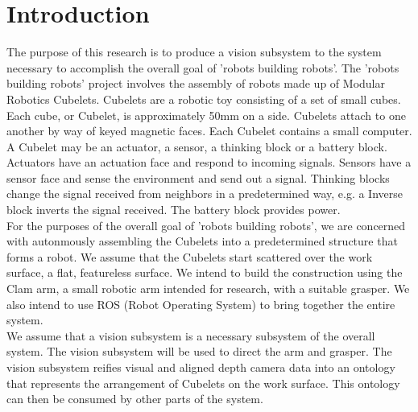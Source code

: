 \documentclass[conference]{IEEEtran}
\begin{document}



%
\IEEEpeerreviewmaketitle



\section{Introduction}
The purpose of this research is to produce a vision subsystem to the system necessary to accomplish the overall goal of 'robots building robots'.  The 'robots building robots' project involves the assembly of robots made up of Modular Robotics Cubelets. Cubelets are a robotic toy consisting of a set of small cubes. Each cube, or Cubelet, is approximately 50mm on a side. Cubelets attach to one another by way of keyed magnetic faces. Each Cubelet contains a small computer. A Cubelet may be an actuator, a sensor, a thinking block or a battery block. Actuators have an actuation face and respond to incoming signals. Sensors have a sensor face and sense the environment and send out a signal. Thinking blocks change the signal received from neighbors in a predetermined way, e.g. a Inverse block inverts the signal received. The battery block provides power.\\

For the purposes of the overall goal of 'robots building robots', we are concerned with autonmously assembling the Cubelets into a predetermined structure that forms a robot. We assume that the Cubelets start scattered over the work surface, a flat, featureless surface. We intend to build the construction using the Clam arm, a small robotic arm intended for research, with a suitable grasper. We also intend to use ROS (Robot Operating System) to bring together the entire system.\\

We assume that a vision subsystem is a necessary subsystem of the overall system. The vision subsystem will be used to direct the arm and grasper. The vision subsystem reifies visual and aligned depth camera data into an ontology that represents the arrangement of Cubelets on the work surface. This ontology can then be consumed by other parts of the system.\\
\end{document}
